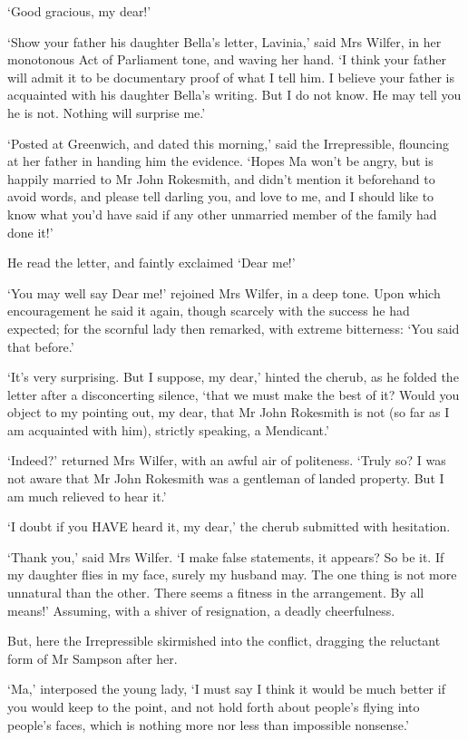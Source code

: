 ‘Good gracious, my dear!’

‘Show your father his daughter Bella’s letter, Lavinia,’ said Mrs
Wilfer, in her monotonous Act of Parliament tone, and waving her hand.
‘I think your father will admit it to be documentary proof of what I
tell him. I believe your father is acquainted with his daughter Bella’s
writing. But I do not know. He may tell you he is not. Nothing will
surprise me.’

‘Posted at Greenwich, and dated this morning,’ said the Irrepressible,
flouncing at her father in handing him the evidence. ‘Hopes Ma won’t be
angry, but is happily married to Mr John Rokesmith, and didn’t mention
it beforehand to avoid words, and please tell darling you, and love
to me, and I should like to know what you’d have said if any other
unmarried member of the family had done it!’

He read the letter, and faintly exclaimed ‘Dear me!’

‘You may well say Dear me!’ rejoined Mrs Wilfer, in a deep tone. Upon
which encouragement he said it again, though scarcely with the success
he had expected; for the scornful lady then remarked, with extreme
bitterness: ‘You said that before.’

‘It’s very surprising. But I suppose, my dear,’ hinted the cherub, as he
folded the letter after a disconcerting silence, ‘that we must make the
best of it? Would you object to my pointing out, my dear, that Mr
John Rokesmith is not (so far as I am acquainted with him), strictly
speaking, a Mendicant.’

‘Indeed?’ returned Mrs Wilfer, with an awful air of politeness. ‘Truly
so? I was not aware that Mr John Rokesmith was a gentleman of landed
property. But I am much relieved to hear it.’

‘I doubt if you HAVE heard it, my dear,’ the cherub submitted with
hesitation.

‘Thank you,’ said Mrs Wilfer. ‘I make false statements, it appears? So
be it. If my daughter flies in my face, surely my husband may. The one
thing is not more unnatural than the other. There seems a fitness in the
arrangement. By all means!’ Assuming, with a shiver of resignation, a
deadly cheerfulness.

But, here the Irrepressible skirmished into the conflict, dragging the
reluctant form of Mr Sampson after her.

‘Ma,’ interposed the young lady, ‘I must say I think it would be much
better if you would keep to the point, and not hold forth about
people’s flying into people’s faces, which is nothing more nor less than
impossible nonsense.’

